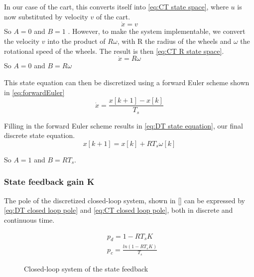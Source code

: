 \documentclass[a4paper]{article}
\newcommand{\newpar}{\vspace{.3cm}\noindent}
\begin{document}
\newar 
In our case of the cart, this converts itself into \autoref{eq:CT state space}, where $u$ is now substituted by velocity $v$ of the cart.
    \begin{equation}
        \dot{x} =  v
        \label{eq:CT state space}
    \end{equation}
\newar 
So $A=0$ and $B=1$ . However, to make the system implementable, we convert the velocity $v$ into the product of $R\omega$, with R the radius of the wheels and $\omega$ the rotational speed of the wheels. The result is then \autoref{eq:CT R state space}.
     \begin{equation}
        \dot{x} =  R\omega
        \label{eq:CT R state space}
    \end{equation}
\newar
So $A=0$ and $B=R\omega$
    
\newpar 
This state equation can then be discretized using a forward Euler scheme shown in \autoref{eq:forwardEuler}
    \begin{equation}
        \dot{x} = \frac{x[k+1] - x[k]}{T_s}
        \label{eq:forwardEuler}
    \end{equation}

\newar
Filling in the forward Euler scheme results in \autoref{eq:DT state equation}, our final discrete state equation.
    \begin{equation}
        x[k+1] = x[k] + RT_s\omega[k]
        \label{eq:DT state equation}
    \end{equation}

\newar
So $A=1$ and $B=RT_s$. 

\subsubsection{State feedback gain K} \label{subsec:gain K}
The pole of the discretized closed-loop system, shown in \autoref{} can be expressed by \autoref{eq:DT closed loop pole} and \ref{eq:CT closed loop pole}, both in discrete and continuous time. 

    \begin{align}
        \label{eq:DT closed loop pole}
        & p_d = 1-RT_sK \\
        \label{eq:CT closed loop pole}
        & p_c = \frac{ln(1-RT_sK)}{T_s}
    \end{align}

\begin{figure}[H]
    \caption{Closed-loop system of the state feedback}
    \label{fig:vraag3.1.b feedback}
\end{figure}
\end{document}
